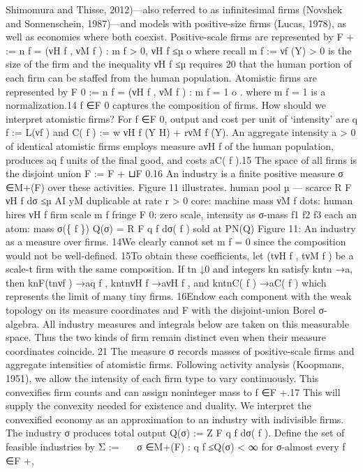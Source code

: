 Shimomura and Thisse, 2012)—also referred to as infinitesimal firms (Novshek and
Sonnenschein, 1987)—and models with positive-size firms (Lucas, 1978), as well as
economies where both coexist.
Positive-scale firms are represented by
F + :=
n
f = (νH
f , νM
f ) : m f > 0, νH
f ≤µ
o
where recall m f := νf (Y) > 0 is the size of the firm and the inequality νH
f ≤µ requires
20
that the human portion of each firm can be staffed from the human population.
Atomistic firms are represented by
F 0 :=
n
f = (νH
f , νM
f ) : m f = 1
o
.
where m f = 1 is a normalization.14 f ∈F 0 captures the composition of firms. How
should we interpret atomistic firms? For f ∈F 0, output and cost per unit of ‘intensity’
are
q f := L(νf )
and
C( f ) := w νH
f (Y H) + rνM
f (Y).
An aggregate intensity a > 0 of identical atomistic firms employs measure aνH
f of
the human population, produces aq f units of the final good, and costs aC( f ).15 The
space of all firms is the disjoint union F := F + ⊔F 0.16 An industry is a finite positive
measure σ ∈M+(F) over these activities. Figure 11 illustrates.
human pool µ — scarce
R
F νH
f dσ ≤µ
AI yM
duplicable at rate r > 0
core: machine mass νM
f
dots: human hires νH
f
ﬁrm scale m f
fringe F 0: zero scale,
intensity as σ-mass
f1
f2
f3
each an atom: mass σ(\{ f \})
Q(σ) = R
F q f dσ( f ) sold at PN(Q)
Figure 11: An industry as a measure over firms.
14We clearly cannot set m f = 0 since the composition would not be well-defined.
15To obtain these coefficients, let (tνH
f , tνM
f ) be a scale-t firm with the same composition. If tn ↓0
and integers kn satisfy kntn →a, then knF(tnνf ) →aq f , kntnνH
f →aνH
f , and kntnC( f ) →aC( f ) which
represents the limit of many tiny firms.
16Endow each component with the weak topology on its measure coordinates and F with the
disjoint-union Borel σ-algebra. All industry measures and integrals below are taken on this measurable
space. Thus the two kinds of firm remain distinct even when their measure coordinates coincide.
21
The measure σ records masses of positive-scale firms and aggregate intensities of
atomistic firms. Following activity analysis (Koopmans, 1951), we allow the intensity
of each firm type to vary continuously. This convexifies firm counts and can assign
noninteger mass to f ∈F +.17 This will supply the convexity needed for existence and
duality. We interpret the convexified economy as an approximation to an industry
with indivisible firms. The industry σ produces total output
Q(σ) :=
Z
F q f dσ( f ).
Define the set of feasible industries by
Σ :=


σ ∈M+(F) :
q f ≤Q(σ) < ∞
for σ-almost every f ∈F +,

